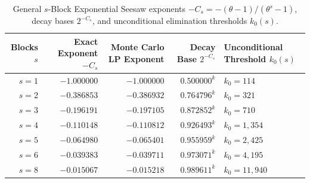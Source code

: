 \documentclass[11pt, a4paper]{amsart}
\theoremstyle{definition}
\begin{document}
\begin{table}[htbp]
\centering
\caption{General $s$-Block Exponential Seesaw exponents $-C_s = -(\theta - 1)/(\theta^s - 1)$, decay bases $2^{-C_s}$, and unconditional elimination thresholds $k_0(s)$.}
\label{tab:s_block_seesaw}
\footnotesize
\begin{tabular}{@{}rrrrl@{}}
\toprule
Blocks $s$ & Exact Exponent $-C_s$ & Monte Carlo LP Exponent & Decay Base $2^{-C_s}$ & Unconditional Threshold $k_0(s)$ \\
\midrule
$s = 1$ & $-1.000000$ & $-1.000000$ & $0.500000^k$ & $k_0 = 114$ \\
$s = 2$ & $-0.386853$ & $-0.386932$ & $0.764796^k$ & $k_0 = 321$ \\
$s = 3$ & $-0.196191$ & $-0.197105$ & $0.872852^k$ & $k_0 = 710$ \\
$s = 4$ & $-0.110148$ & $-0.110812$ & $0.926493^k$ & $k_0 = 1,354$ \\
$s = 5$ & $-0.064980$ & $-0.065401$ & $0.955959^k$ & $k_0 = 2,425$ \\
$s = 6$ & $-0.039383$ & $-0.039711$ & $0.973071^k$ & $k_0 = 4,195$ \\
$s = 8$ & $-0.015067$ & $-0.015218$ & $0.989611^k$ & $k_0 = 11,940$ \\
\bottomrule
\end{tabular}
\end{table}
\end{document}
